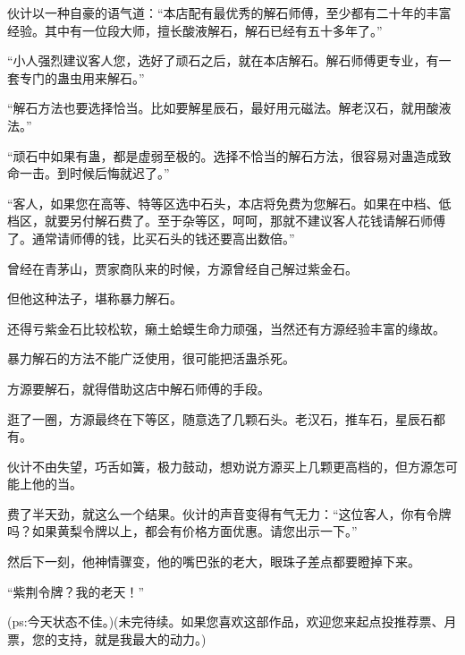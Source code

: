 \begin{this_body}
伙计以一种自豪的语气道：“本店配有最优秀的解石师傅，至少都有二十年的丰富经验。其中有一位段大师，擅长酸液解石，解石已经有五十多年了。”

“小人强烈建议客人您，选好了顽石之后，就在本店解石。解石师傅更专业，有一套专门的蛊虫用来解石。”

“解石方法也要选择恰当。比如要解星辰石，最好用元磁法。解老汉石，就用酸液法。”

“顽石中如果有蛊，都是虚弱至极的。选择不恰当的解石方法，很容易对蛊造成致命一击。到时候后悔就迟了。”

“客人，如果您在高等、特等区选中石头，本店将免费为您解石。如果在中档、低档区，就要另付解石费了。至于杂等区，呵呵，那就不建议客人花钱请解石师傅了。通常请师傅的钱，比买石头的钱还要高出数倍。”

曾经在青茅山，贾家商队来的时候，方源曾经自己解过紫金石。

但他这种法子，堪称暴力解石。

还得亏紫金石比较松软，癞土蛤蟆生命力顽强，当然还有方源经验丰富的缘故。

暴力解石的方法不能广泛使用，很可能把活蛊杀死。

方源要解石，就得借助这店中解石师傅的手段。

逛了一圈，方源最终在下等区，随意选了几颗石头。老汉石，推车石，星辰石都有。

伙计不由失望，巧舌如簧，极力鼓动，想劝说方源买上几颗更高档的，但方源怎可能上他的当。

费了半天劲，就这么一个结果。伙计的声音变得有气无力：“这位客人，你有令牌吗？如果黄梨令牌以上，都会有价格方面优惠。请您出示一下。”

然后下一刻，他神情骤变，他的嘴巴张的老大，眼珠子差点都要瞪掉下来。

“紫荆令牌？我的老天！”

(ps:今天状态不佳。)(未完待续。如果您喜欢这部作品，欢迎您来起点投推荐票、月票，您的支持，就是我最大的动力。)

\end{this_body}

